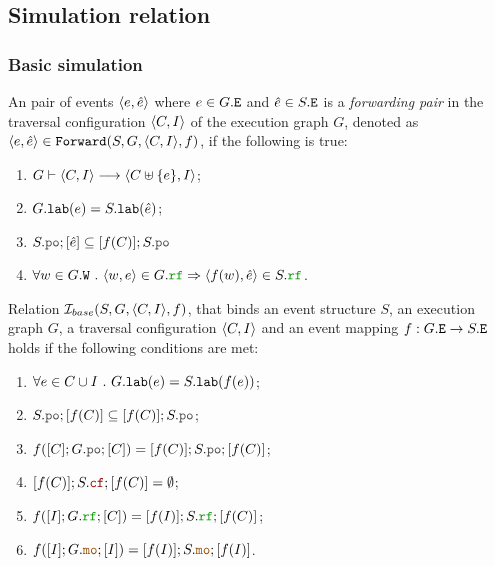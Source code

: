 \documentclass[12pt]{article}
\begin{document}
\subsection{Simulation relation}

\subsubsection{Basic simulation}

\begin{definition}
  An pair of events $\langle e, \hat{e} \rangle$ where $e \in G.{\mathtt{E}}$ and $\hat{e} \in S.{\mathtt{E}}$
  is a \emph{forwarding pair} in
  the traversal configuration $\langle C, I \rangle$ of the \imm execution graph $G$,
  denoted as $\langle e, \hat{e} \rangle \in {\mathtt{Forward}}(S, G, \langle C, I \rangle, f)$, if the following is true:
  \begin{enumerate}[label=\textbf{F.\arabic*}]

    \item \label{item:frwd-coverable}
      $G \vdash \langle C, I \rangle \longrightarrow \langle C \uplus \{e\}, I \rangle$;
     
    \item \label{item:frwd-lab}
      $G.{\mathtt{lab}}(e) = S.{\mathtt{lab}}(\hat{e})$;

    \item \label{item:frwd-front}
      $S.\lPO;[\hat{e}] \subseteq [f(C)];S.\lPO$

    \item \label{item:frwd-rf}
      $\forall{w \in G.\lW} ~.~ \tup{w, e} \in G.\lRF \Rightarrow \tup{f(w), \hat{e}} \in S.\lRF$.

  \end{enumerate}
\end{definition}

\begin{definition}
  Relation $\mathcal{I}_{base}(S, G, \langle C, I \rangle, f)$, that binds an 
  event structure $S$, an \imm execution graph $G$,
  a traversal configuration $\langle C, I \rangle$
  and an event mapping $f : G.{\mathtt{E}} \rightarrow S.{\mathtt{E}}$ 
  holds if the following conditions are met:
  \begin{enumerate}[label=\textbf{S.\arabic*}]

  \item \label{item:sim-lab}
    $\forall{e \in C \cup I} ~.~ G.{\mathtt{lab}}(e) = S.{\mathtt{lab}}(f(e))$;

  \item \label{item:sim-po-prfx} 
    $S.\lPO;[f(C)] \subseteq [f(C)];S.\lPO$;

  \item \label{item:sim-po}
    $f([C];G.\lPO;[C]) = [f(C)];S.\lPO;[f(C)]$;
    
  \item \label{item:sim-cf}
    $[f(C)];S.\lCF;[f(C)] = \emptyset$;

  \item \label{item:sim-rf}
    $f([I];G.\lRF;[C]) = [f(I)];S.\lRF;[f(C)]$;

  \item \label{item:sim-mo}
    $f([I];G.\lMO;[I]) = [f(I)];S.\lMO;[f(I)]$.
    
  \end{enumerate}
\end{definition}
\end{document}
